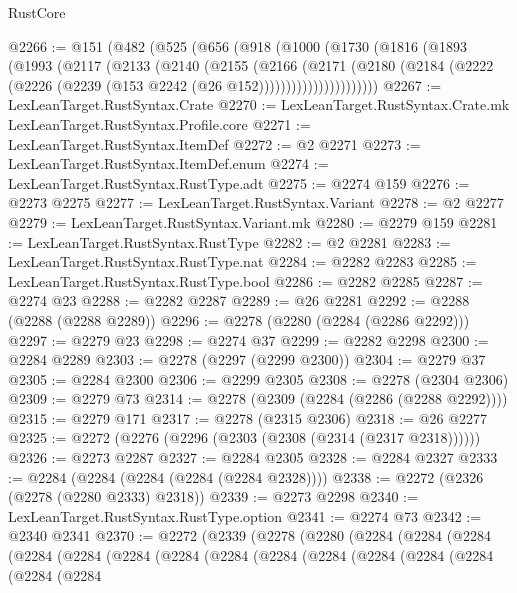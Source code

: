 \begin{lexlean}{RustCore}
\begin{coremodule}
@2266 := @151
    (@482
      (@525
        (@656
          (@918
            (@1000
              (@1730
                (@1816
                  (@1893
                    (@1993
                      (@2117
                        (@2133
                          (@2140
                            (@2155
                              (@2166
                                (@2171
                                  (@2180
                                    (@2184
                                      (@2222
                                        (@2226 (@2239 (@153 @2242 (@26 @152))))))))))))))))))))))
@2267 := LexLeanTarget.RustSyntax.Crate
@2270 := LexLeanTarget.RustSyntax.Crate.mk LexLeanTarget.RustSyntax.Profile.core
@2271 := LexLeanTarget.RustSyntax.ItemDef
@2272 := @2 @2271
@2273 := LexLeanTarget.RustSyntax.ItemDef.enum
@2274 := LexLeanTarget.RustSyntax.RustType.adt
@2275 := @2274 @159
@2276 := @2273 @2275
@2277 := LexLeanTarget.RustSyntax.Variant
@2278 := @2 @2277
@2279 := LexLeanTarget.RustSyntax.Variant.mk
@2280 := @2279 @159
@2281 := LexLeanTarget.RustSyntax.RustType
@2282 := @2 @2281
@2283 := LexLeanTarget.RustSyntax.RustType.nat
@2284 := @2282 @2283
@2285 := LexLeanTarget.RustSyntax.RustType.bool
@2286 := @2282 @2285
@2287 := @2274 @23
@2288 := @2282 @2287
@2289 := @26 @2281
@2292 := @2288 (@2288 (@2288 @2289))
@2296 := @2278 (@2280 (@2284 (@2286 @2292)))
@2297 := @2279 @23
@2298 := @2274 @37
@2299 := @2282 @2298
@2300 := @2284 @2289
@2303 := @2278 (@2297 (@2299 @2300))
@2304 := @2279 @37
@2305 := @2284 @2300
@2306 := @2299 @2305
@2308 := @2278 (@2304 @2306)
@2309 := @2279 @73
@2314 := @2278 (@2309 (@2284 (@2286 (@2288 @2292))))
@2315 := @2279 @171
@2317 := @2278 (@2315 @2306)
@2318 := @26 @2277
@2325 := @2272 (@2276 (@2296 (@2303 (@2308 (@2314 (@2317 @2318))))))
@2326 := @2273 @2287
@2327 := @2284 @2305
@2328 := @2284 @2327
@2333 := @2284 (@2284 (@2284 (@2284 (@2284 @2328))))
@2338 := @2272 (@2326 (@2278 (@2280 @2333) @2318))
@2339 := @2273 @2298
@2340 := LexLeanTarget.RustSyntax.RustType.option
@2341 := @2274 @73
@2342 := @2340 @2341
@2370 := @2272
    (@2339
      (@2278
        (@2280
          (@2284
            (@2284
              (@2284
                (@2284
                  (@2284
                    (@2284
                      (@2284
                        (@2284
                          (@2284
                            (@2284
                              (@2284
                                (@2284
                                  (@2284
                                    (@2284
                                      (@2284

\end{coremodule}
\end{lexlean}
